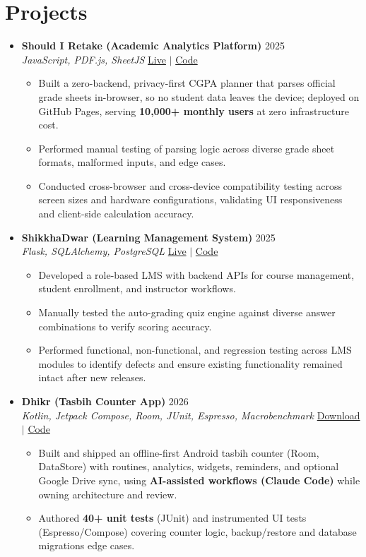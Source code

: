 \documentclass[a4paper]{article}
\newcommand{\resumeItem}[1]{
  \item\small{
    {#1 \vspace{-2pt}}
  }
}
\newcommand{\resumeItemListStart}{\begin{itemize}}
\newcommand{\resumeItemListEnd}{\end{itemize}\vspace{-5pt}}
\begin{document}
\section{Projects}
  \begin{itemize}[leftmargin=0.15in, label={}, itemsep=3pt]

    \item
    \textbf{Should I Retake (Academic Analytics Platform)} \hfill 2025\\
    \small\textit{JavaScript, PDF.js, SheetJS} \hfill
    \href{https://badhon495.github.io/should-i-retake/}{Live} $|$
    \href{https://github.com/badhon495/should-i-retake}{Code}
    \vspace{-5pt}
    \resumeItemListStart
      \resumeItem{Built a zero-backend, privacy-first CGPA planner that parses official grade sheets in-browser, so no student data leaves the device; deployed on GitHub Pages, serving \textbf{10,000+ monthly users} at zero infrastructure cost.}
\resumeItem{Performed manual testing of parsing logic across diverse grade sheet formats, malformed inputs, and edge cases.}
\resumeItem{Conducted cross-browser and cross-device compatibility testing across screen sizes and hardware configurations, validating UI responsiveness and client-side calculation accuracy.}
    \resumeItemListEnd

    \item
    \textbf{ShikkhaDwar (Learning Management System)} \hfill 2025\\
    \small\textit{Flask, SQLAlchemy, PostgreSQL} \hfill
    \href{https://shikkhadwar-81r2.onrender.com/}{Live} $|$
    \href{https://github.com/nihal-kabir/ShikkhaDwar}{Code}
    \vspace{-5pt}
\resumeItemListStart
    \resumeItem{Developed a role-based LMS with backend APIs for course management, student enrollment, and instructor workflows.}
    \resumeItem{Manually tested the auto-grading quiz engine against diverse answer combinations to verify scoring accuracy.}
    \resumeItem{Performed functional, non-functional, and regression testing across LMS modules to identify defects and ensure existing functionality remained intact after new releases.}
\resumeItemListEnd
    \item
    \textbf{Dhikr (Tasbih Counter App)} \hfill 2026\\
    \small\textit{Kotlin, Jetpack Compose, Room, JUnit, Espresso, Macrobenchmark} \hfill
    \href{https://github.com/badhon495/Dhikr/releases/latest}{Download} $|$
    \href{https://github.com/badhon495/Dhikr}{Code}
    \vspace{-5pt}
    \resumeItemListStart
      \resumeItem{Built and shipped an offline-first Android tasbih counter (Room, DataStore) with routines, analytics, widgets, reminders, and optional Google Drive sync, using \textbf{AI-assisted workflows (Claude Code)} while owning architecture and review.}
      \resumeItem{Authored \textbf{40+ unit tests} (JUnit) and instrumented UI tests (Espresso/Compose) covering counter logic, backup/restore and database migrations edge cases.}
    \resumeItemListEnd


\end{itemize}
\end{document}
